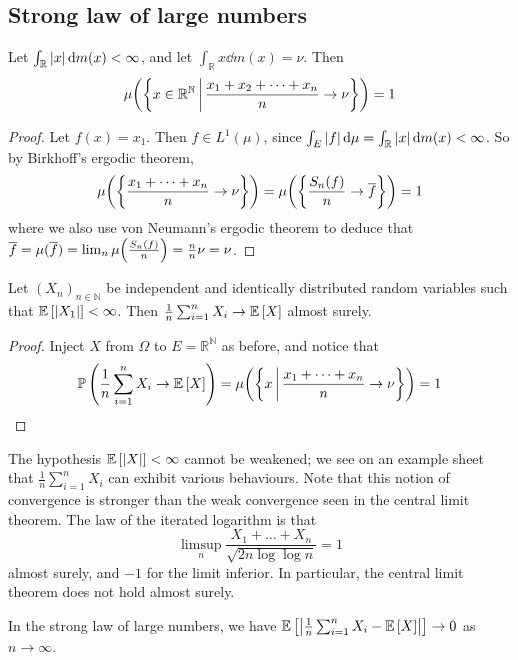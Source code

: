 \subsection{Strong law of large numbers}
\begin{theorem}
	Let \( \int_{\mathbb R} \abs{x} \dd{m(x)} < \infty \), and let \( \int_{\mathbb R} x \dd{m(x)} = \nu \).
	Then
	\[ \mu\qty(\qty{x \in \mathbb R^{\mathbb N} \,\middle|\,\frac{x_1 + x_2 + \dots + x_n}{n} \to \nu}) = 1 \]
\end{theorem}
\begin{proof}
	Let \( f(x) = x_1 \).
	Then \( f \in L^1(\mu) \), since \( \int_E \abs{f} \dd{\mu} = \int_{\mathbb R} \abs{x} \dd{m(x)} < \infty \).
	So by Birkhoff's ergodic theorem,
	\[ \mu\qty(\qty{ \frac{x_1 + \dots + x_n}{n} \to \nu }) = \mu\qty(\qty{ \frac{S_n(f)}{n} \to \overline f }) = 1 \]
	where we also use von Neumann's ergodic theorem to deduce that \( \overline f = \mu(\overline f) = \lim_n \mu\qty(\frac{S_n(f)}{n}) = \frac{n}{n} \nu = \nu \).
\end{proof}
\begin{theorem}
	Let \( (X_n)_{n \in \mathbb N} \) be independent and identically distributed random variables such that \( \mathbb{E}\left[{\abs{X_1}}\right] < \infty \).
	Then \( \frac{1}{n} \sum_{i=1}^n X_i \to \mathbb{E}\left[{X}\right] \) almost surely.
\end{theorem}
\begin{proof}
	Inject \( X \) from \( \Omega \) to \( E = \mathbb R^{\mathbb N} \) as before, and notice that
	\[ \mathbb{P}\left({\frac{1}{n} \sum_{i=1}^n X_i \to \mathbb{E}\left[{X}\right]}\right) = \mu\qty(\qty{ x \,\middle|\,\frac{x_1 + \dots + x_n}{n} \to \nu }) = 1 \]
\end{proof}
\begin{remark}
	The hypothesis \( \mathbb{E}\left[{\abs{X}}\right] < \infty \) cannot be weakened; we see on an example sheet that \( \frac{1}{n} \sum_{i=1}^n X_i \) can exhibit various behaviours.
	Note that this notion of convergence is stronger than the weak convergence seen in the central limit theorem.
	The law of the iterated logarithm is that
	\[ \limsup_n \frac{X_1 + \dots + X_n}{\sqrt{2 n \log \log n}} = 1 \]
	almost surely, and \( -1 \) for the limit inferior.
	In particular, the central limit theorem does not hold almost surely.
\end{remark}
\begin{corollary}
	In the strong law of large numbers, we have \( \mathbb{E}\left[{\abs{\frac{1}{n} \sum_{i=1}^n X_i - \mathbb{E}\left[{X}\right]}}\right] \to 0 \) as \( n \to \infty \).
\end{corollary}
